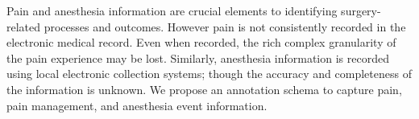 Pain and anesthesia information are crucial elements to identifying surgery-related processes and outcomes. However pain is not consistently recorded in the electronic medical record. Even when recorded, the rich complex granularity of the pain experience may be lost. Similarly, anesthesia information is recorded using local electronic collection systems; though the accuracy and completeness of the information is unknown. We propose an annotation schema to capture pain, pain management, and anesthesia event information.
